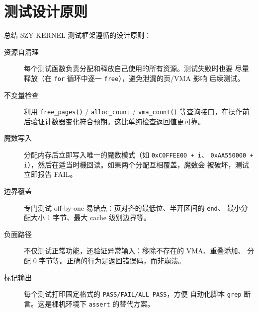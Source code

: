 \section{测试设计原则}
\label{sec:test-principles}

总结 SZY-KERNEL 测试框架遵循的设计原则：

\begin{description}
  \item[资源自清理] 每个测试函数负责分配和释放自己使用的所有资源。测试失败时也要
    尽量释放（在 \texttt{for} 循环中逐一 \texttt{free}），避免泄漏的页/VMA 影响
    后续测试。

  \item[不变量检查] 利用 \texttt{free\_pages()} / \texttt{alloc\_count} / \texttt{vma\_count()}
    等查询接口，在操作前后验证计数器变化符合预期。这比单纯检查返回值更可靠。

  \item[魔数写入] 分配内存后立即写入唯一的魔数模式（如 \texttt{0xC0FFEE00 + i}、
    \texttt{0xAA550000 + i}），然后在适当时機回读。如果两个分配互相覆盖，魔数会
    被破坏，测试立即报告 FAIL。

  \item[边界覆盖] 专门测试 off-by-one 易错点：页对齐的最低位、半开区间的 \texttt{end}、
    最小分配大小 1 字节、最大 cache 级别边界等。

  \item[负面路径] 不仅测试正常功能，还验证异常输入：移除不存在的 VMA、重叠添加、
    分配 0 字节等。正确的行为是返回错误码，而非崩溃。

  \item[标记输出] 每个测试打印固定格式的 \texttt{PASS/FAIL/ALL PASS}，方便
    自动化脚本 \texttt{grep} 断言。这是裸机环境下 \texttt{assert} 的替代方案。
\end{description}

